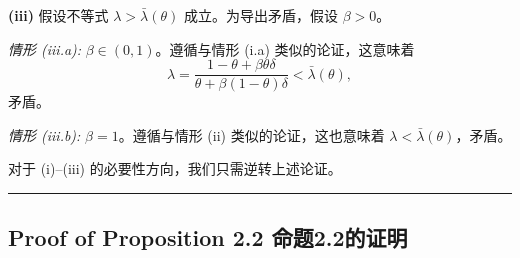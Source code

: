 \documentclass[12pt,a4paper]{article}
\newenvironment{translation}{%
  \par\vspace{2pt}\noindent%
  \color{transblue}%
  \ignorespaces
}{%
  \par\vspace{4pt}\hrule\vspace{6pt}%
}
\begin{document}
\begin{translation}
\textbf{(iii)} 假设不等式 $\lambda > \bar{\lambda}(\theta)$ 成立。为导出矛盾，假设 $\beta > 0$。

\textit{情形 (iii.a):} $\beta \in (0, 1)$。遵循与情形 (i.a) 类似的论证，这意味着
\[
\lambda = \frac{1 - \theta + \beta\theta\delta}{\theta + \beta(1-\theta)\delta} < \bar{\lambda}(\theta),
\]
矛盾。

\textit{情形 (iii.b):} $\beta = 1$。遵循与情形 (ii) 类似的论证，这也意味着 $\lambda < \bar{\lambda}(\theta)$，矛盾。

对于 (i)--(iii) 的必要性方向，我们只需逆转上述论证。
\end{translation}

\subsection*{Proof of Proposition 2.2 \hfill 命题2.2的证明}
\end{document}
